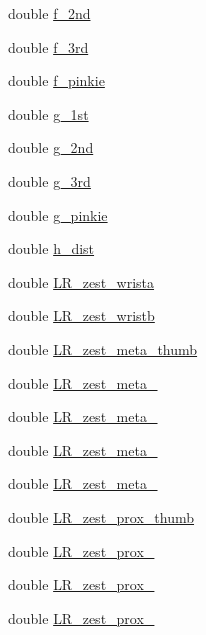 \begin{DoxyCompactItemize}
\item 
double \hyperlink{classFullhand__dist_a1fca8c119f92b6fc3fde608679163339}{f\_\-2nd}
\item 
double \hyperlink{classFullhand__dist_aa2e0806e52c7b02657dfc7a68e2e9d0d}{f\_\-3rd}
\item 
double \hyperlink{classFullhand__dist_a9c3da861db4a277b0a149efc4f53ca67}{f\_\-pinkie}
\item 
double \hyperlink{classFullhand__dist_a23aafeae187e2d3f23825d6534b9f9c1}{g\_\-1st}
\item 
double \hyperlink{classFullhand__dist_a784d55f542c3a25668577ddddcefd41e}{g\_\-2nd}
\item 
double \hyperlink{classFullhand__dist_af639475219dd57fb310655b1394b7a70}{g\_\-3rd}
\item 
double \hyperlink{classFullhand__dist_ad56ca15f4e4277d84014be5bf29f370f}{g\_\-pinkie}
\item 
double \hyperlink{classFullhand__dist_a08af1cb10cf3e148fa45c25afbebc8dd}{h\_\-dist}
\item 
double \hyperlink{classFullhand__dist_aa072dcf4e7fde28f7ca997426f42897b}{LR\_\-zest\_\-wrista}
\item 
double \hyperlink{classFullhand__dist_a11a09aca9e340d66fccaf6424eb7b06f}{LR\_\-zest\_\-wristb}
\item 
double \hyperlink{classFullhand__dist_ac39e5d049f68614aebed907099025a11}{LR\_\-zest\_\-meta\_\-thumb}
\item 
double \hyperlink{classFullhand__dist_a27656e4d6e9529e5f279ba53b6a4b1da}{LR\_\-zest\_\-meta\_}
\item 
double \hyperlink{classFullhand__dist_a5a25f9d1332da1655d95b0df71a958e1}{LR\_\-zest\_\-meta\_}
\item 
double \hyperlink{classFullhand__dist_a2db68e1d8908b2e884da92a2683c1485}{LR\_\-zest\_\-meta\_}
\item 
double \hyperlink{classFullhand__dist_a1a3268224fae796baa8e728de4de63cf}{LR\_\-zest\_\-meta\_}
\item 
double \hyperlink{classFullhand__dist_aedb43a4f22ba3b0aaa855e950767a4a9}{LR\_\-zest\_\-prox\_\-thumb}
\item 
double \hyperlink{classFullhand__dist_a932ad52d1a05c1f656e8bd1e70ed74ae}{LR\_\-zest\_\-prox\_}
\item 
double \hyperlink{classFullhand__dist_a3dfe77521f71952b6e2a8a54df375ff9}{LR\_\-zest\_\-prox\_}
\item 
double \hyperlink{classFullhand__dist_ab09c01d7f3d5d2b9272f0dca271c7ad2}{LR\_\-zest\_\-prox\_}

\end{DoxyCompactItemize}
